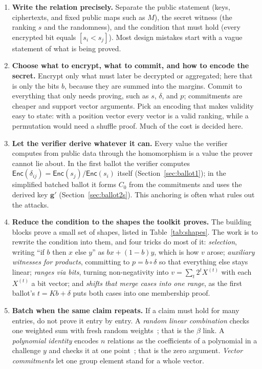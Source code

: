 \documentclass[11pt,a4paper]{article}
\newcommand{\Enc}{\mathsf{Enc}}
\theoremstyle{remark}
\begin{document}
\begin{enumerate}[leftmargin=*]
  \item \textbf{Write the relation precisely.} Separate the public
  statement (keys, ciphertexts, and fixed public maps such as $M$), the
  secret witness (the ranking $s$ and the randomness), and the condition
  that must hold (every encrypted bit equals $[s_i < s_j]$). Most design
  mistakes start with a vague statement of what is being proved.

  \item \textbf{Choose what to encrypt, what to commit, and how to encode
  the secret.} Encrypt only what must later be decrypted or aggregated;
  here that is only the bits $b$, because they are summed into the
  margins. Commit to everything that only needs proving, such as $s$,
  $\delta$, and $p$; commitments are cheaper and support vector arguments.
  Pick an encoding that makes validity easy to state: with a position
  vector every vector is a valid ranking, while a permutation would need a
  shuffle proof. Much of the cost is decided here.

  \item \textbf{Let the verifier derive whatever it can.} Every value the
  verifier computes from public data through the homomorphism is a value
  the prover cannot lie about. In the first ballot the verifier computes
  $\Enc(\delta_{ij}) = \Enc(s_j) / \Enc(s_i)$ itself
  (Section~\ref{sec:ballot1}); in the simplified batched ballot it forms
  $C_0$ from the commitments and uses the derived key $\mathbf{g}'$
  (Section~\ref{sec:ballot2s}). This anchoring is often what rules out the
  attacks.

  \item \textbf{Reduce the condition to the shapes the toolkit proves.}
  The building blocks prove a small set of shapes, listed in
  Table~\ref{tab:shapes}. The work is to rewrite the condition into them,
  and four tricks do most of it: \emph{selection}, writing ``if $b$ then
  $x$ else $y$'' as $b x + (1 - b) y$, which is how $v$ arose;
  \emph{auxiliary witnesses for products}, committing to $p = b \circ
  \delta$ so that everything else stays linear; \emph{ranges via bits},
  turning non-negativity into $v = \sum_t 2^t X^{(t)}$ with each $X^{(t)}$
  a bit vector; and \emph{shifts that merge cases into one range}, as the
  first ballot's $t = K b + \delta$ puts both cases into one membership
  proof.

  \item \textbf{Batch when the same claim repeats.} If a claim must hold
  for many entries, do not prove it entry by entry. A \emph{random linear
  combination} checks one weighted sum with fresh random
  weights~\cite{bgr98}; that is the $\beta$ link. A \emph{polynomial
  identity} encodes $n$ relations as the coefficients of a polynomial in a
  challenge $y$ and checks it at one point~\cite{schwartz,zippel}; that is
  the zero argument. \emph{Vector commitments} let one group element stand
  for a whole vector.


\end{enumerate}
\end{document}
